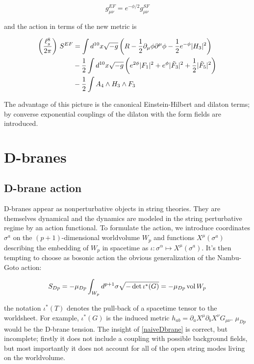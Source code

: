 \begin{equation}
	g_{\mu\nu}^{EF} = e^{-\phi/2} g_{\mu\nu}^{SF}
	\label{}
\end{equation}

and the action in terms of the new metric is\cite{BBS}

\begin{align}
\begin{split}
	\left(\frac{\ell_s^8}{2\pi}\right) \,S^{EF} &=  \int d^{10} x \sqrt{-g} \left( R - \frac{1}{2} \partial_\mu \phi \partial^\mu \phi - \frac{1}{2} e^{-\phi} |H_3|^2 \right)\\
	&- \frac{1}{2}  \int d^{10}x \sqrt{-g} \left( e^{2\phi} |F_1|^2 + e^\phi |\tilde F_3|^2 + \frac{1}{2} |\tilde F_5|^2 \right)\\
	&- \frac{1}{2}  \int A_4 \wedge H_3 \wedge F_3 
	\label{}
\end{split}
\end{align}

The advantage of this picture is the canonical Einstein-Hilbert and dilaton terms; by converse exponential couplings of the dilaton with the form fields are introduced.

\section{D-branes}

\subsection{D-brane action}

D-branes appear as nonperturbative objects in string theories. They are themselves dynamical and the dynamics are modeled in the string perturbative regime by an action functional\cite{ibanezU}. To formulate the action, we introduce coordinates $\sigma^a$ on the $(p+1)$-dimensional worldvolume $W_p$ and functions $X^\mu(\sigma^a)$ describing the embedding of $W_p$ in spacetime as $\iota:\sigma^\alpha \mapsto X^\mu(\sigma^a)$. It's then tempting to choose as bosonic action the obvious generalization of the Nambu-Goto action:

\begin{equation}
	S_{Dp} = - \mu_{Dp} \int_{W_p} d^{p+1} \sigma \sqrt{-\det \iota^*(G)} = - \mu_{Dp} \operatorname{vol} W_p
	\label{naiveDbrane}
\end{equation}

the notation $\iota^*(T)$ denotes the pull-back of a spacetime tensor to the worldsheet. For example, $\iota^*(G)$ is the induced metric $h_{ab} = \partial_a X^\mu \partial_b X^\nu G_{\mu\nu}$. $\mu_{Dp}$ would be the D-brane tension. The insight of \eqref{naiveDbrane} is correct, but incomplete; firstly it does not include a coupling with possible background fields, but most importantly it does not account for all of the open string modes living on the worldvolume.

